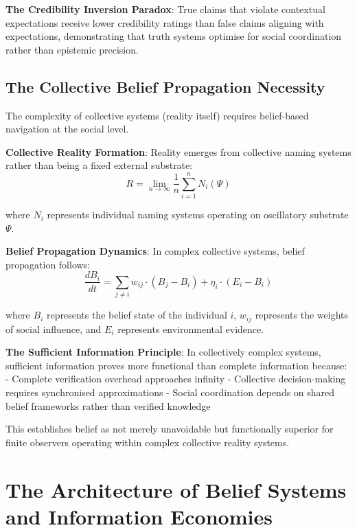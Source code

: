 \documentclass[12pt,a4paper]{article}
\begin{document}
\textbf{The Credibility Inversion Paradox}: True claims that violate contextual expectations receive lower credibility ratings than false claims aligning with expectations, demonstrating that truth systems optimise for social coordination rather than epistemic precision.

\subsection{The Collective Belief Propagation Necessity}

The complexity of collective systems (reality itself) requires belief-based navigation at the social level.

\textbf{Collective Reality Formation}: Reality emerges from collective naming systems rather than being a fixed external substrate:
\begin{equation}
R = \lim_{n \to \infty} \frac{1}{n} \sum_{i=1}^{n} N_i(\Psi)
\end{equation}

where $N_i$ represents individual naming systems operating on oscillatory substrate $\Psi$.

\textbf{Belief Propagation Dynamics}: In complex collective systems, belief propagation follows:
\begin{equation}
\frac{dB_i}{dt} = \sum_{j \neq i} w_{ij} \cdot (B_j - B_i) + \eta_i \cdot (E_i - B_i)
\end{equation}

where $B_i$ represents the belief state of the individual $i$, $w_{ij}$ represents the weights of social influence, and $E_i$ represents environmental evidence.

\textbf{The Sufficient Information Principle}: In collectively complex systems, sufficient information proves more functional than complete information because:
- Complete verification overhead approaches infinity
- Collective decision-making requires synchronised approximations
- Social coordination depends on shared belief frameworks rather than verified knowledge

This establishes belief as not merely unavoidable but functionally superior for finite observers operating within complex collective reality systems.

\section{The Architecture of Belief Systems and Information Economies}
\end{document}
